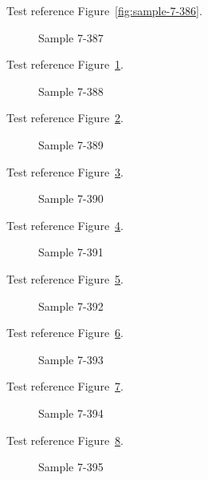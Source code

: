 Test reference Figure~\ref{fig:sample-7-386}.

\begin{figure}[tbhp]
\caption{Sample 7-387}
\label{fig:sample-7-387}
\end{figure}

Test reference Figure~\ref{fig:sample-7-387}.

\begin{figure}[tbhp]
\caption{Sample 7-388}
\label{fig:sample-7-388}
\end{figure}

Test reference Figure~\ref{fig:sample-7-388}.

\begin{figure}[tbhp]
\caption{Sample 7-389}
\label{fig:sample-7-389}
\end{figure}

Test reference Figure~\ref{fig:sample-7-389}.

\begin{figure}[tbhp]
\caption{Sample 7-390}
\label{fig:sample-7-390}
\end{figure}

Test reference Figure~\ref{fig:sample-7-390}.

\begin{figure}[tbhp]
\caption{Sample 7-391}
\label{fig:sample-7-391}
\end{figure}

Test reference Figure~\ref{fig:sample-7-391}.

\begin{figure}[tbhp]
\caption{Sample 7-392}
\label{fig:sample-7-392}
\end{figure}

Test reference Figure~\ref{fig:sample-7-392}.

\begin{figure}[tbhp]
\caption{Sample 7-393}
\label{fig:sample-7-393}
\end{figure}

Test reference Figure~\ref{fig:sample-7-393}.

\begin{figure}[tbhp]
\caption{Sample 7-394}
\label{fig:sample-7-394}
\end{figure}

Test reference Figure~\ref{fig:sample-7-394}.

\begin{figure}[tbhp]
\caption{Sample 7-395}
\label{fig:sample-7-395}
\end{figure}

